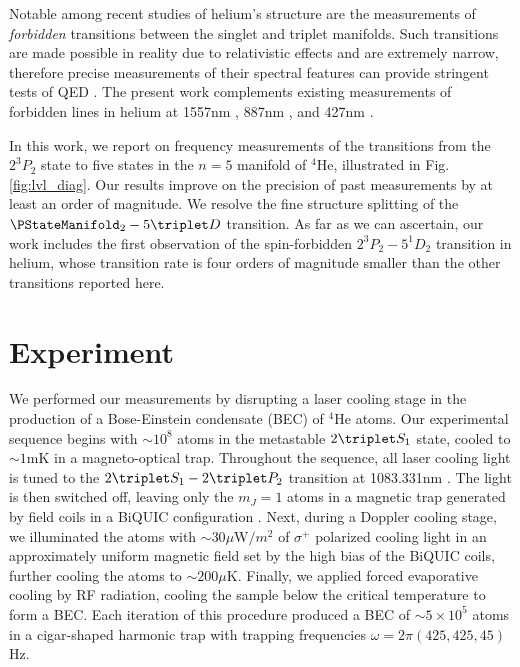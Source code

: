   Notable among recent studies of helium's structure are the measurements of \emph{forbidden} transitions between the singlet and triplet manifolds. Such transitions are made possible in reality due to relativistic effects and are extremely narrow, therefore precise measurements of their spectral features can provide stringent tests of QED \cite{Lach01}. The present work complements existing measurements of forbidden lines in helium at 1557nm \cite{Rooij11,Rengelink18}, 887nm \cite{Notermans14}, and 427nm \cite{Thomas20}.

  In this work, we report on frequency measurements of the transitions from the $2^3P_2$ state to five states in the $n=5$ manifold of $^4$He, illustrated in Fig. \ref{fig:lvl_diag}. 
  Our results improve on the precision of past measurements \cite{Martin60} by at least an order of magnitude.
  We resolve the fine structure splitting of the $\PStateManifold_2 - 5\triplet D$ transition. As far as we can ascertain, our work includes the first observation of the spin-forbidden $2^3P_2 - 5^1D_2$ transition in helium, whose transition rate is four orders of magnitude smaller than the other transitions reported here.

  

\section{Experiment}

We performed our measurements by disrupting a laser cooling stage in the production of a Bose-Einstein condensate (BEC) of $^{4}\textrm{He}$ atoms. Our experimental sequence begins with $\sim10^8$ atoms in the metastable $2\triplet S_1$ state, cooled to  $\sim1 \textrm{mK}$ in a magneto-optical trap. Throughout the sequence, all laser cooling light is tuned to the $2\triplet S_1 - 2\triplet P_2$ transition at 1083.331nm \cite{Shin16}. The light is then switched off, leaving only the $m_J=1$ atoms in a magnetic trap generated by field coils in a BiQUIC configuration \cite{Dall07}. Next, during a Doppler cooling stage, we illuminated the atoms with $\sim$30$\mu$W$/m^2$ of $\sigma^+$ polarized cooling light in an approximately uniform magnetic field set by the high bias of the BiQUIC coils, further cooling the atoms to $\sim200\mu \textrm{K}$. Finally, we applied forced evaporative cooling by RF radiation, cooling the sample below the critical temperature to form a BEC. Each iteration of this procedure produced a BEC of $\sim 5\times10^5$ atoms in a cigar-shaped harmonic trap with trapping frequencies $\omega = 2\pi (425,425,45)$ Hz. 

